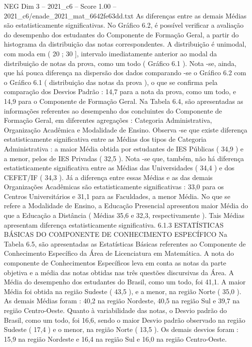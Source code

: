 \begin{textsample}{NEG Dim 3 – 2021\_c6 – Score 1.00 – 2021\_c6/enade\_2021\_mat\_6642fe63dd.txt}
As diferenças entre as demais Médias são estatisticamente significativas.
No Gráfico 6.2, é possível verificar a avaliação do desempenho dos estudantes do Componente de Formação Geral, a partir do histograma da distribuição das notas correspondentes.
A distribuição é unimodal, com moda em ( 20 ; 30 ], intervalo imediatamente anterior ao modal da distribuição de notas da prova, como um todo ( Gráfico 6.1 ).
Nota -se, ainda, que há pouca diferença na dispersão dos dados comparando -se o Gráfico 6.2 com o Gráfico 6.1 ( distribuição das notas da prova ), o que se confirma pela comparação dos Desvios Padrão : 14,7 para a nota da prova, como um todo, e 14,9 para o Componente de Formação Geral.
Na Tabela 6.4, são apresentadas as informações referentes ao desempenho dos concluintes do Componente de Formação Geral, em diferentes agregações : Categoria Administrativa, Organização Acadêmica e Modalidade de Ensino.
Observa -se que existe diferença estatisticamente significativa entre as Médias dos tipos de Categoria Administrativa : a maior Média obtida por estudantes de IES Públicas ( 34,9 ) e a menor, pelos de IES Privadas ( 32,5 ).
Nota -se que, também, não há diferença estatisticamente significativa entre as Médias das Universidades ( 34,4 ) e dos CEFET/IF ( 34,3 ).
Já a diferença entre essas Médias e as das demais Organizações Acadêmicas são estatisticamente significativas : 33,0 para os Centros Universitários e 31,1 para as Faculdades, a menor Média.
No que se refere a Modalidade de Ensino, a Educação Presencial apresentou maior Média do que a Educação a Distância ( Médias 35,6 e 32,3, respectivamente ).
Tais Médias apresentam diferença estatisticamente significativa. 6.1.3 ESTATÍSTICAS BÁSICAS DO COMPONENTE DE CONHECIMENTO ESPECÍFICO Na Tabela 6.5, são apresentadas as Estatísticas Básicas referentes ao Componente de Conhecimento Específico da Área de Licenciatura em Matemática.
A nota do componente de Conhecimentos Específicos leva em conta as notas da parte objetiva e a média das notas obtidas nas três questões discursivas da Área.
A Média do desempenho dos estudantes do Brasil, como um todo, foi 41,1.
A maior Média foi obtida na região Sudeste ( 43,5 ), e a menor, na região Norte ( 35,0 ).
As demais Médias foram : 40,2 na região Nordeste, 40,5 na região Sul e 39,7 na região Centro-Oeste.
Quanto à variabilidade das notas, o Desvio padrão do Brasil, como um todo, foi 16,6, sendo o maior Desvio padrão observado na região Sudeste ( 17,4 ) e o menor, na região Norte ( 13,5 ).
Os demais desvios foram : 15,9 na região Nordeste e 16,4 na região Sul e 16,0 na região Centro-Oeste.

\end{textsample}
